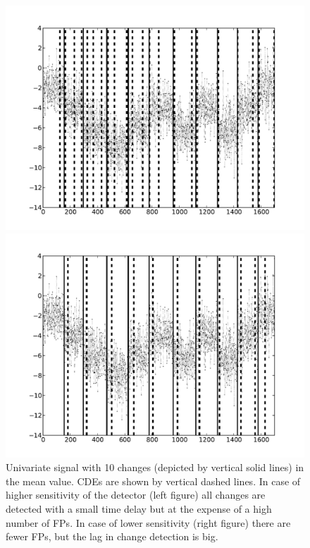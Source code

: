 \begin{figure}
\centering
\begin{minipage}{0.45\textwidth}
\includegraphics[width=1.0\textwidth]{pics/changeDetection/Behv1.pdf}
\end{minipage}
\begin{minipage}{0.45\textwidth}
\includegraphics[width=1.0\textwidth]{pics/changeDetection/Behv2.pdf}
\end{minipage}
\caption{Univariate signal with 10 changes (depicted by vertical solid lines) in the mean value.
CDEs are shown by vertical dashed lines.
In case of higher sensitivity of the detector (left figure) all changes are detected with a small time delay but at the expense of a high number of FPs.
In case of lower sensitivity (right figure) there are fewer FPs, but the lag in change detection is big.}
\label{fig:detectorsbehaviour}
\end{figure}



